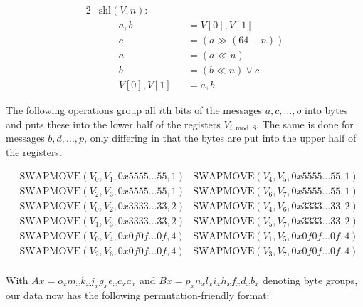 \begin{alignat*}{2}
    &\text{shl}(V,n): \\
    &\qquad a,b&&=V[0],V[1] \\
    &\qquad c&&=(a\gg (64-n)) \\
    &\qquad a&&=(a\ll n) \\
    &\qquad b&&=(b\ll n)\lor c \\
    &\qquad V[0],V[1]&&=a,b
\end{alignat*}

The following operations group all $i$th bits of the messages $a,c,\dots,o$
into bytes and puts these into the lower half of the registers $V_{i\bmod 8}$.
The same is done for messages $b,d,\dots,p$, only differing in that the bytes
are put into the upper half of the registers.

\begin{align*}
    &\text{SWAPMOVE}(V_0,V_1,0x5555\dots 55,1) &\text{SWAPMOVE}(V_4,V_5,0x5555\dots 55,1) \\
    &\text{SWAPMOVE}(V_2,V_3,0x5555\dots 55,1) &\text{SWAPMOVE}(V_6,V_7,0x5555\dots 55,1) \\
    &\text{SWAPMOVE}(V_0,V_2,0x3333\dots 33,2) &\text{SWAPMOVE}(V_4,V_6,0x3333\dots 33,2) \\
    &\text{SWAPMOVE}(V_1,V_3,0x3333\dots 33,2) &\text{SWAPMOVE}(V_5,V_7,0x3333\dots 33,2) \\
    &\text{SWAPMOVE}(V_0,V_4,0x0f0f\dots 0f,4) &\text{SWAPMOVE}(V_1,V_5,0x0f0f\dots 0f,4) \\
    &\text{SWAPMOVE}(V_2,V_6,0x0f0f\dots 0f,4) &\text{SWAPMOVE}(V_3,V_7,0x0f0f\dots 0f,4) \\
\end{align*}

With $Ax=o_xm_xk_xj_xg_xe_xc_xa_x$ and $Bx=p_xn_xl_xi_xh_xf_xd_xb_x$ denoting
byte groups, our data now has the following permutation-friendly format:

